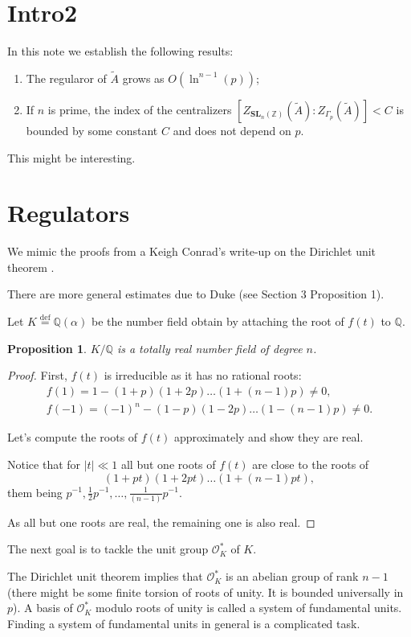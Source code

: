 \documentclass[a4paper]{article}
\newtheorem{Prop}[Thm]{Proposition}
\newcommand{\eqdef}{\stackrel{\mathrm{def}}{=}}
\newcommand{\Q}{\mathbb{Q}}        %
\renewcommand{\O}{\mathcal{O}}        %
\newcommand{\SLp}{\Gamma_p}        %
\newcommand{\SLn}{\mathbf{SL}_n(\mathbb{Z})}        %
\begin{document}
\section{Intro2}
In this note we establish the following results:
\begin{enumerate}
\item
The regularor of $\tilde A$
grows as $O (\ln^{n-1} (p)) $; 

\item
If $n$ is prime,
the index of the centralizers
$ [Z_{\SLn}(\tilde A) : Z_{\SLp}(\tilde A)] < C$
is bounded by some constant $C$ and does not depend on $p$.
\end{enumerate}
This might be interesting.

\section{Regulators}
We mimic the proofs from a Keigh Conrad's write-up on the Dirichlet unit theorem \cite{conraddirichlet}.

There are more general estimates due to Duke \cite{duke2003extreme} (see Section 3 Proposition 1).


Let $K \eqdef \Q(\alpha)$ be the number field obtain by attaching the root of $f(t)$ to $\Q$.
\begin{Prop}
$K / \Q$ is a totally real number field of degree $n$.
\end{Prop}

\begin{proof}
First, $f(t)$ is irreducible as it has no rational roots: 
\begin{gather}
f(1) = 1 - (1 + p) (1 + 2p) \ldots (1 + (n - 1) p) \ne 0,\\
f(-1) = (-1)^n - (1 - p) (1 - 2p) \ldots (1 - (n - 1) p ) \ne 0.
\end{gather}

Let's compute the roots of $f(t)$ approximately and show they are real.

Notice that for $|t| \ll 1$ all but one roots of $f(t)$ are close to the roots of 
\[
(1 + pt) (1 + 2pt) \ldots (1 + (n - 1) p t)
,\] 
them being $p^{-1} , \frac{1}{2} p^{-1} , \ldots, \frac{1}{(n-1) } p^{-1} $.

As all but one roots are real, the remaining one is also real.
\end{proof}

The next goal is to tackle the unit group $\O_K^*$ of $K$.

The Dirichlet unit theorem implies that $\O_K^*$ is an abelian group of rank $n-1$ (there might be some finite torsion of roots of unity.  It is bounded universally in $p$).
A basis of $\O_K^*$ modulo roots of unity is called a system of fundamental units.
Finding a system of fundamental units in general is a complicated task.
\end{document}
